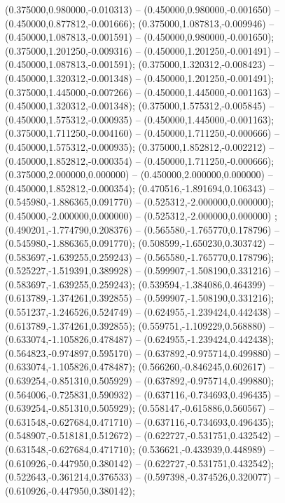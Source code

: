  (0.375000,0.980000,-0.010313) -- (0.450000,0.980000,-0.001650) -- (0.450000,0.877812,-0.001666);
 (0.375000,1.087813,-0.009946) -- (0.450000,1.087813,-0.001591) -- (0.450000,0.980000,-0.001650);
 (0.375000,1.201250,-0.009316) -- (0.450000,1.201250,-0.001491) -- (0.450000,1.087813,-0.001591);
 (0.375000,1.320312,-0.008423) -- (0.450000,1.320312,-0.001348) -- (0.450000,1.201250,-0.001491);
 (0.375000,1.445000,-0.007266) -- (0.450000,1.445000,-0.001163) -- (0.450000,1.320312,-0.001348);
 (0.375000,1.575312,-0.005845) -- (0.450000,1.575312,-0.000935) -- (0.450000,1.445000,-0.001163);
 (0.375000,1.711250,-0.004160) -- (0.450000,1.711250,-0.000666) -- (0.450000,1.575312,-0.000935);
 (0.375000,1.852812,-0.002212) -- (0.450000,1.852812,-0.000354) -- (0.450000,1.711250,-0.000666);
 (0.375000,2.000000,0.000000) -- (0.450000,2.000000,0.000000) -- (0.450000,1.852812,-0.000354);
 (0.470516,-1.891694,0.106343) -- (0.545980,-1.886365,0.091770) -- (0.525312,-2.000000,0.000000);
 (0.450000,-2.000000,0.000000) -- (0.525312,-2.000000,0.000000) ;
 (0.490201,-1.774790,0.208376) -- (0.565580,-1.765770,0.178796) -- (0.545980,-1.886365,0.091770);
 (0.508599,-1.650230,0.303742) -- (0.583697,-1.639255,0.259243) -- (0.565580,-1.765770,0.178796);
 (0.525227,-1.519391,0.389928) -- (0.599907,-1.508190,0.331216) -- (0.583697,-1.639255,0.259243);
 (0.539594,-1.384086,0.464399) -- (0.613789,-1.374261,0.392855) -- (0.599907,-1.508190,0.331216);
 (0.551237,-1.246526,0.524749) -- (0.624955,-1.239424,0.442438) -- (0.613789,-1.374261,0.392855);
 (0.559751,-1.109229,0.568880) -- (0.633074,-1.105826,0.478487) -- (0.624955,-1.239424,0.442438);
 (0.564823,-0.974897,0.595170) -- (0.637892,-0.975714,0.499880) -- (0.633074,-1.105826,0.478487);
 (0.566260,-0.846245,0.602617) -- (0.639254,-0.851310,0.505929) -- (0.637892,-0.975714,0.499880);
 (0.564006,-0.725831,0.590932) -- (0.637116,-0.734693,0.496435) -- (0.639254,-0.851310,0.505929);
 (0.558147,-0.615886,0.560567) -- (0.631548,-0.627684,0.471710) -- (0.637116,-0.734693,0.496435);
 (0.548907,-0.518181,0.512672) -- (0.622727,-0.531751,0.432542) -- (0.631548,-0.627684,0.471710);
 (0.536621,-0.433939,0.448989) -- (0.610926,-0.447950,0.380142) -- (0.622727,-0.531751,0.432542);
 (0.522643,-0.361214,0.376533) -- (0.597398,-0.374526,0.320077) -- (0.610926,-0.447950,0.380142);
